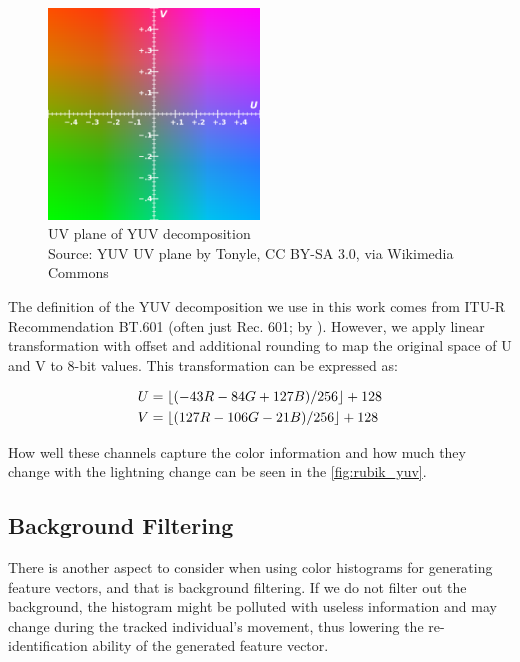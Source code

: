 \begin{figure}
    \centering
    \includegraphics[width=5.6cm]{img/YUV_UV_plane.svg.png}
    \caption[UV plane of YUV decomposition]{UV plane of YUV decomposition\\
    Source: YUV UV plane\protect\footnotemark{} by Tonyle, CC BY-SA 3.0, via Wikimedia Commons \protect\footnotemark{}}
    \label{fig:yuv_decomposition}
\end{figure}
\addtocounter{footnote}{-2}

The definition of the YUV decomposition we use in this work comes from ITU-R Recommendation BT.601
(often just Rec. 601; by \cite{bt2011studio}). However, we apply linear
transformation with offset and additional rounding to map the original space of U and V
to 8-bit values. This transformation can be expressed
as:

\begin{align*}
U &= \lfloor(-43R - 84G + 127B) / 256\rfloor + 128 \\
V &= \lfloor(127R - 106G - 21B) / 256\rfloor + 128
\end{align*}

How well these channels capture the color information and how much they change with the lightning change can be seen in the \autoref{fig:rubik_yuv}.

\subsection{Background Filtering}

There is another aspect to consider when using color histograms for generating feature vectors, and that is background filtering. If we do not filter out the background, the histogram might be polluted with useless information and may change during the tracked individual's movement, thus lowering the re-identification ability of the generated feature vector.

